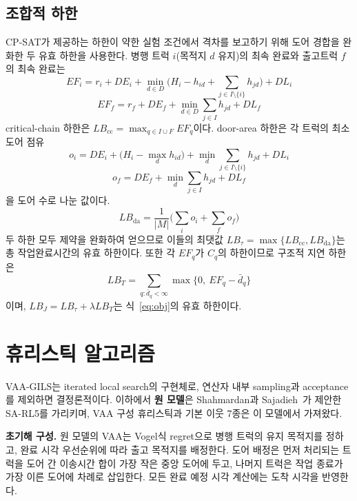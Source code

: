 \documentclass[10pt,a4paper]{article}
\begin{document}
\subsection{조합적 하한}
CP-SAT가 제공하는 하한이 약한 실험 조건에서 격차를 보고하기 위해 도어 경합을 완화한 두 유효 하한을
사용한다. 병행 트럭 $i$(목적지 $d$ 유지)의 최속 완료와 출고트럭 $f$의 최속
완료는
\begin{equation}EF_i=r_i+DE_i+\min_{d\in D}\Big(H_i-h_{id}+\textstyle\sum_{j\in I\setminus\{i\}}h_{jd}\Big)+DL_i\tag{17}\end{equation}
\begin{equation}EF_f=r_f+DE_f+\min_{d\in D}\textstyle\sum_{j\in I}h_{jd}+DL_f\tag{18}\end{equation}
critical-chain 하한은 $LB_{\mathrm{cc}}=\max_{q\in I\cup F}EF_q$이다. door-area
하한은 각 트럭의 최소 도어 점유
\begin{equation}o_i=DE_i+\Big(H_i-\max_d h_{id}\Big)+\min_d\textstyle\sum_{j\in I\setminus\{i\}}h_{jd}+DL_i\tag{19}\end{equation}
\begin{equation}o_f=DE_f+\min_d\textstyle\sum_{j\in I}h_{jd}+DL_f\tag{20}\end{equation}
을 도어 수로 나눈 값이다.
\begin{equation}LB_{\mathrm{da}}=\frac{1}{|M|}\Big(\sum_i o_i+\sum_f o_f\Big)\tag{21}\end{equation}
두 하한 모두 제약을 완화하여 얻으므로 이들의 최댓값
$LB_\tau=\max\{LB_{\mathrm{cc}},LB_{\mathrm{da}}\}$는 총 작업완료시간의 유효 하한이다.
또한 각 $EF_q$가 $C_q$의 하한이므로 구조적 지연 하한은
\begin{equation}LB_T=\sum_{q:\bar d_q<\infty}\max\{0,\ EF_q-\bar d_q\}\tag{22}\end{equation}
이며, $LB_J=LB_\tau+\lambda LB_T$는 식~\eqref{eq:obj}의 유효 하한이다.

\section{휴리스틱 알고리즘}

VAA-GILS는 iterated local search의 구현체로, 연산자 내부 sampling과 acceptance를
제외하면 결정론적이다. 이하에서 \textbf{원 모델}은 Shahmardan과
Sajadieh~\cite{shahmardan2020}가 제안한 SA-RL5를 가리키며, VAA 구성 휴리스틱과
기본 이웃 7종은 이 모델에서 가져왔다.

\textbf{초기해 구성.} 원 모델의 VAA는 Vogel식 regret으로 병행 트럭의 유지 목적지를
정하고, 완료 시각 우선순위에 따라 출고 목적지를 배정한다. 도어 배정은 먼저 처리되는
트럭을 도어 간 이송시간 합이 가장 작은 중앙 도어에 두고, 나머지 트럭은 작업 종료가 가장
이른 도어에 차례로 삽입한다. 모든 완료 예정 시각 계산에는 도착 시각을 반영한다.
\end{document}
